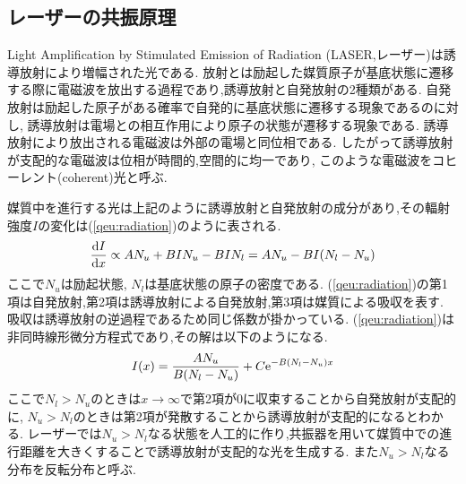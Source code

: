 \subsection{レーザーの共振原理\cite{jikken}}
\label{subsec:laser_theory}
Light Amplification by Stimulated Emission of Radiation (LASER,レーザー)は誘導放射により増幅された光である.
放射とは励起した媒質原子が基底状態に遷移する際に電磁波を放出する過程であり,誘導放射と自発放射の2種類がある.
自発放射は励起した原子がある確率で自発的に基底状態に遷移する現象であるのに対し,
誘導放射は電場との相互作用により原子の状態が遷移する現象である.
誘導放射により放出される電磁波は外部の電場と同位相である.
したがって誘導放射が支配的な電磁波は位相が時間的,空間的に均一であり,
このような電磁波をコヒーレント(coherent)光と呼ぶ.

媒質中を進行する光は上記のように誘導放射と自発放射の成分があり,その輻射強度$I$の変化は(\ref{qeu:radiation})のように表される.
\begin{align}
  \label{qeu:radiation}
  \frac{{\rm d}I}{{\rm d}x}\propto AN_u+BIN_u-BIN_l=AN_u-BI(N_l-N_u)
\end{align}
ここで$N_u$は励起状態, $N_l$は基底状態の原子の密度である.
(\ref{qeu:radiation})の第1項は自発放射,第2項は誘導放射による自発放射,第3項は媒質による吸収を表す.
吸収は誘導放射の逆過程であるため同じ係数が掛かっている.
(\ref{qeu:radiation})は非同時線形微分方程式であり,その解は以下のようになる.
\begin{align}
  I(x)=\frac{AN_u}{B(N_l-N_u)}+C{\rm e}^{-B(N_l-N_u)x}
\end{align}
ここで$N_l>N_u$のときは$x\rightarrow\infty$で第2項が0に収束することから自発放射が支配的に,
$N_u>N_l$のときは第2項が発散することから誘導放射が支配的になるとわかる.
レーザーでは$N_u>N_l$なる状態を人工的に作り,共振器を用いて媒質中での進行距離を大きくすることで誘導放射が支配的な光を生成する.
また$N_u>N_l$なる分布を反転分布と呼ぶ.

